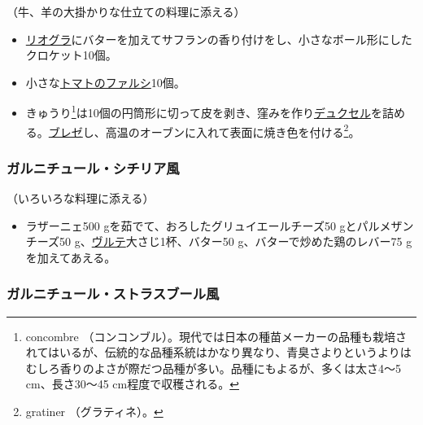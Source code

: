 \begin{recette}
（牛、羊の大掛かりな仕立ての料理に添える）

\begin{itemize}
\item
  \protect\hyperlink{riz-au-gras}{リオグラ}にバターを加えてサフランの香り付けをし、小さなボール形にしたクロケット10個。
\item
  小さな\protect\hyperlink{tomates-farcies}{トマトのファルシ}10個。
\item
  きゅうり\footnote{concombre
    （コンコンブル）。現代では日本の種苗メーカーの品種も栽培されてはいるが、伝統的な品種系統はかなり異なり、青臭さよりというよりはむしろ香りのよさが際だつ品種が多い。品種にもよるが、多くは太さ4〜5
    cm、長さ30〜45 cm程度で収穫される。}は10個の円筒形に切って皮を剥き、窪みを作り\protect\hyperlink{duxelles-seche}{デュクセル}を詰める。\protect\hyperlink{braisage-des-legumes}{ブレゼ}し、高温のオーブンに入れて表面に焼き色を付ける\footnote{gratiner
    （グラティネ）。}。
\end{itemize}

\atoaki{}

\hypertarget{garniture-a-la-sicilienne}{%
\subsubsection{ガルニチュール・シチリア風}\label{garniture-a-la-sicilienne}}



（いろいろな料理に添える）

\begin{itemize}
\tightlist
\item
  ラザーニェ500 gを茹でて、おろしたグリュイエールチーズ50
  gとパルメザンチーズ50
  g、\protect\hyperlink{veloute}{ヴルテ}大さじ1杯、バター50
  g、バターで炒めた鶏のレバー75 gを加えてあえる。
\end{itemize}

\atoaki{}

\hypertarget{garniture-a-la-strasbbourgeoise}{%
\subsubsection{ガルニチュール・ストラスブール風}\label{garniture-a-la-strasbbourgeoise}}


\end{recette}
